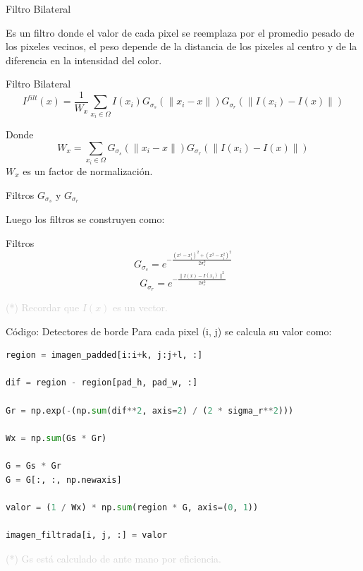 \documentclass{beamer}
\begin{document}
\begin{frame}[fragile]{Filtro Bilateral}
	\justifying
	
	Es un filtro donde el valor de cada pixel se reemplaza por el promedio pesado de los pixeles vecinos, el peso depende de la distancia de los pixeles al centro y de la diferencia en la intensidad del color.
	
	\begin{block}{Filtro Bilateral}
		\[
		I^{filt}(x) = \frac{1}{W_x} \sum_{x_i \in \Omega} I(x_i) G_{\sigma_s}(\|x_i - x\|) G_{\sigma_r}(\|I(x_i) - I(x)\|)
		\]
	\end{block}
	
	\begin{block}{Donde}
		\[
		W_x = \sum_{x_i \in \Omega} G_{\sigma_s}(\|x_i - x\|) G_{\sigma_r}(\|I(x_i) - I(x)\|)
		\]
		$W_x$ es un factor de normalización.
	\end{block}
	
\end{frame}

\begin{frame}[fragile]{Filtros $G_{\sigma_s}$ y $G_{\sigma_r}$}
	\justifying
	
	Luego los filtros se construyen como:
	
	\begin{block}{Filtros}
		\[
		 G_{\sigma_s} = e^{-\frac{(x^1-x^1_i)^2 + (x^2-x^2_i)^2}{2 \sigma_s^2}}
		\]
		\[
		G_{\sigma_r} = e^{-\frac{\|I(x) - I(x_i)\|^2}{2 \sigma_r^2}}
		\]
	\end{block}
	
	\vfill
	\footnotesize \textcolor{lightgray}{(*) Recordar que $I(x)$ es un vector.}
\end{frame}

\begin{frame}[fragile]{Código: Detectores de borde}
	\justifying
	Para cada pixel (i, j) se calcula su valor como:
	
	\begin{lstlisting}[language=Python]
region = imagen_padded[i:i+k, j:j+l, :]

dif = region - region[pad_h, pad_w, :]

Gr = np.exp(-(np.sum(dif**2, axis=2) / (2 * sigma_r**2)))

Wx = np.sum(Gs * Gr)

G = Gs * Gr
G = G[:, :, np.newaxis]

valor = (1 / Wx) * np.sum(region * G, axis=(0, 1))

imagen_filtrada[i, j, :] = valor
	\end{lstlisting}
	
	\vfill
	\footnotesize \textcolor{lightgray}{(*) Gs está calculado de ante mano por eficiencia.}
\end{frame}
\end{document}
